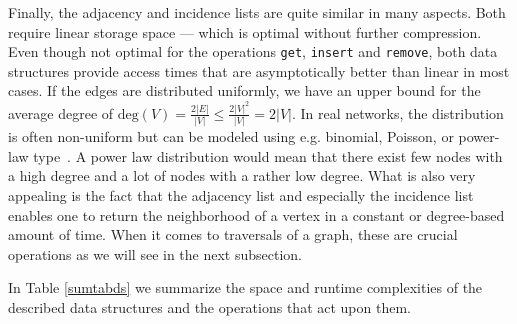             Finally, the adjacency and incidence lists are quite similar in many aspects. Both require linear storage space --- which is optimal without further compression. 
            Even though not optimal for the operations \texttt{get}, \texttt{insert} and \texttt{remove}, both data structures provide access times that are asymptotically better than linear in most cases.
            If the edges are distributed uniformly, we have an upper bound for the average degree of $\text{deg}(V) = \frac{2|E|}{|V|} \leq \frac{2 |V|^2}{|V|} = 2 |V|$.
            In real networks, the distribution is often non-uniform but can be modeled using e.g. binomial, Poisson, or power-law type~\autocite{holme2019rare}. 
            A power law distribution would mean that there exist few nodes with a high degree and a lot of nodes with a rather low degree. 
            What is also very appealing is the fact that the adjacency list and especially the incidence list enables one to return the neighborhood of a vertex in a constant or degree-based amount of time. 
            When it comes to traversals of a graph, these are crucial operations as we will see in the next subsection. 
            
            In Table \ref{sumtabds} we summarize the space and runtime complexities of the described data structures and the operations that act upon them. 
            
